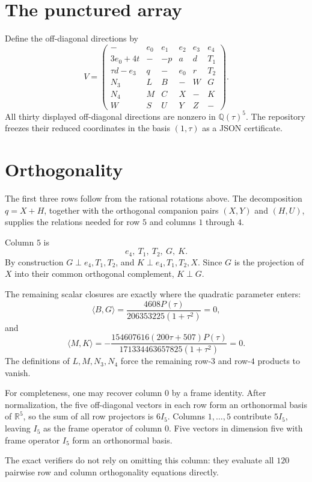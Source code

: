 \documentclass[11pt]{article}
\theoremstyle{definition}
\theoremstyle{plain}
\newcommand{\R}{\mathbb{R}}
\newcommand{\Q}{\mathbb{Q}}
\begin{document}
\section{The punctured array}

Define the off-diagonal directions by
\[
V=
\begin{pmatrix}
- & e_0 & e_1 & e_2 & e_3 & e_4\\
3e_0+4t & - & -p & a & d & T_1\\
\tau d-e_3 & q & - & e_0 & r & T_2\\
N_3 & L & B & - & W & G\\
N_4 & M & C & X & - & K\\
W & S & U & Y & Z & -
\end{pmatrix}.
\]
All thirty displayed off-diagonal directions are nonzero in \(\Q(\tau)^5\).
The repository freezes their reduced coordinates in the basis \((1,\tau)\) as a JSON certificate.

\section{Orthogonality}

The first three rows follow from the rational rotations above.
The decomposition \(q=X+H\), together with the orthogonal companion pairs \((X,Y)\) and \((H,U)\), supplies the relations needed for row \(5\) and columns \(1\) through \(4\).

Column \(5\) is
\[
e_4,\ T_1,\ T_2,\ G,\ K.
\]
By construction \(G\perp e_4,T_1,T_2\), and \(K\perp e_4,T_1,T_2,X\).
Since \(G\) is the projection of \(X\) into their common orthogonal complement, \(K\perp G\).

The remaining scalar closures are exactly where the quadratic parameter enters:
\[
\langle B,G\rangle
=
\frac{4608P(\tau)}
     {206353225(1+\tau^2)}
=0,
\]
and
\[
\langle M,K\rangle
=
-\frac{154607616(200\tau+507)P(\tau)}
       {171334463657825(1+\tau^2)}
=0.
\]
The definitions of \(L,M,N_3,N_4\) force the remaining row-\(3\) and row-\(4\) products to vanish.

For completeness, one may recover column \(0\) by a frame identity.
After normalization, the five off-diagonal vectors in each row form an orthonormal basis of \(\R^5\), so the sum of all row projectors is \(6I_5\).
Columns \(1,\ldots,5\) contribute \(5I_5\), leaving \(I_5\) as the frame operator of column \(0\).
Five vectors in dimension five with frame operator \(I_5\) form an orthonormal basis.

The exact verifiers do not rely on omitting this column: they evaluate all \(120\) pairwise row and column orthogonality equations directly.
\end{document}
